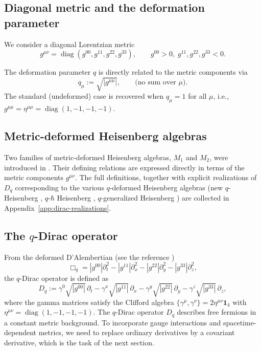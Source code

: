 \documentclass[12pt,a4paper]{article}
\theoremstyle{plain}
\theoremstyle{definition}
\begin{document}
\subsection{Diagonal metric and the deformation parameter}

We consider a diagonal Lorentzian metric
\[
g^{\mu\nu} = \operatorname{diag}(g^{00}, g^{11}, g^{22}, g^{33}),
\qquad g^{00}>0,\; g^{11},g^{22},g^{33}<0.
\]

The deformation parameter $q$ is directly related to the metric components via
\begin{equation}\label{eq:q_metric_relation}
q_\mu := \sqrt{|g^{\mu\mu}|}, \qquad \text{(no sum over }\mu\text{)}.
\end{equation}
The standard (undeformed) case is recovered when $q_\mu = 1$ for all $\mu$, i.e., $g^{\mu\mu} = \eta^{\mu\mu} = \operatorname{diag}(1,-1,-1,-1)$.

\subsection{Metric-deformed Heisenberg algebras}

Two families of metric-deformed Heisenberg algebras, $M_1$ and $M_2$, were introduced in \cite{Jaramillo2026a}. Their defining relations are expressed directly in terms of the metric components $g^{\mu\nu}$. The full definitions, together with explicit realizations of $D_q$ corresponding to the various $q$-deformed Heisenberg algebras  (new $q$-Heisenberg \cite{Jaramillo2025}, $q$-$\hbar$ Heisenberg \cite{Volovich-Arefeva-91}, $q$-generalized Heisenberg \cite{Razavinia-Lopes2022}) are collected in Appendix~\ref{app:dirac-realizations}.


\subsection{The $q$-Dirac operator}

From the deformed D'Alembertian (see the reference \cite{Jaramillo2026a})
\[
\Box_q = |g^{00}|\partial_t^2 - |g^{11}|\partial_x^2 - |g^{22}|\partial_y^2 - |g^{33}|\partial_z^2,
\]
the $q$-Dirac operator is defined as
\begin{equation}\label{eq:Dq_definition}
D_q := \gamma^0\sqrt{|g^{00}|}\,\partial_t - \gamma^x\sqrt{|g^{11}|}\,\partial_x - \gamma^y\sqrt{|g^{22}|}\,\partial_y - \gamma^z\sqrt{|g^{33}|}\,\partial_z,
\end{equation}
where the gamma matrices satisfy the Clifford algebra $\{\gamma^\mu,\gamma^\nu\}=2\eta^{\mu\nu}\mathbf{1}_4$ with $\eta^{\mu\nu}=\operatorname{diag}(1,-1,-1,-1)$.  The $q$-Dirac operator $D_q$ describes free fermions in a constant metric background. To incorporate gauge interactions and spacetime-dependent metrics, we need to replace ordinary derivatives by a covariant derivative, which is the task of the next section.
\end{document}
